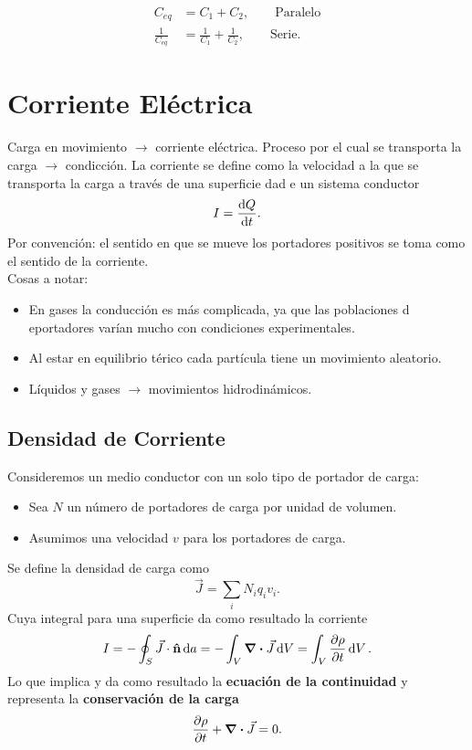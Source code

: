 \begin{align*}
	C_{eq} &= C_1 + C_2, \qquad \text{Paralelo} \\
	\frac{1}{C_{eq}} &= \frac{1}{C_1} + \frac{1}{C_2}, \qquad \text{Serie.}
\end{align*}



\chapter{Corriente Eléctrica}
Carga en movimiento $\to$ corriente eléctrica. Proceso por el cual se transporta la carga $\to$ condicción. La corriente se define como la velocidad a la que se transporta la carga a través de una superficie dad e un sistema conductor
\begin{equation}
	I = \dv{Q}{t}.
\end{equation}
Por convención: el sentido en que se mueve los portadores positivos se toma como el sentido de la corriente. \\

Cosas a notar:
\begin{itemize}
	\item En gases la conducción es más complicada, ya que las poblaciones d eportadores varían mucho con condiciones experimentales.
	\item Al estar en equilibrio térico cada partícula tiene un movimiento aleatorio.
	\item Líquidos y gases $\to$ movimientos hidrodinámicos.
\end{itemize}

\section{Densidad de Corriente}
Consideremos un medio conductor con un solo tipo de portador de carga:
\begin{itemize}
	\item Sea $N$ un número de portadores de carga por unidad de volumen.
	\item Asumimos una velocidad $v$ para los portadores de carga.
\end{itemize}
Se define la densidad de carga como
\begin{equation}
	\vec{J} = \sum _i N_i q_i v_i.
\end{equation}
Cuya integral para una superficie da como resultado la corriente
\begin{equation}
	I = -\oint _S \vec{J} \cdot \vu{n} \dd{a} = -\int _V \div{\vec{J}} \dd{V} = \int _V \pdv{\rho}{t} \dd{V}.
\end{equation}
Lo que implica y da como resultado la \textbf{ecuación de la continuidad} y representa la \textbf{conservación de la carga}
\begin{equation}
	\pdv{\rho}{t} + \div{\vec{J}} = 0.
\end{equation}


